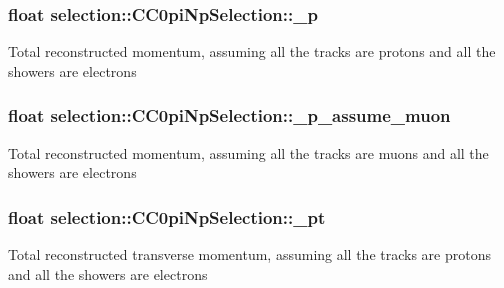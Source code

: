 \subsubsection[{\texorpdfstring{\+\_\+p}{_p}}]{\setlength{\rightskip}{0pt plus 5cm}float selection\+::\+C\+C0pi\+Np\+Selection\+::\+\_\+p\hspace{0.3cm}{\ttfamily [private]}}\hypertarget{classselection_1_1CC0piNpSelection_afae64b232d6b3526032b289c91b092cb}{}\label{classselection_1_1CC0piNpSelection_afae64b232d6b3526032b289c91b092cb}
Total reconstructed momentum, assuming all the tracks are protons and all the showers are electrons 
\subsubsection[{\texorpdfstring{\+\_\+p\+\_\+assume\+\_\+muon}{_p_assume_muon}}]{\setlength{\rightskip}{0pt plus 5cm}float selection\+::\+C\+C0pi\+Np\+Selection\+::\+\_\+p\+\_\+assume\+\_\+muon\hspace{0.3cm}{\ttfamily [private]}}\hypertarget{classselection_1_1CC0piNpSelection_a2e861bf5b394c18e24f58d9fef5c33a5}{}\label{classselection_1_1CC0piNpSelection_a2e861bf5b394c18e24f58d9fef5c33a5}
Total reconstructed momentum, assuming all the tracks are muons and all the showers are electrons 
\subsubsection[{\texorpdfstring{\+\_\+pt}{_pt}}]{\setlength{\rightskip}{0pt plus 5cm}float selection\+::\+C\+C0pi\+Np\+Selection\+::\+\_\+pt\hspace{0.3cm}{\ttfamily [private]}}\hypertarget{classselection_1_1CC0piNpSelection_a98281b58b33ff8c03fa9b00f3f3baa06}{}\label{classselection_1_1CC0piNpSelection_a98281b58b33ff8c03fa9b00f3f3baa06}
Total reconstructed transverse momentum, assuming all the tracks are protons and all the showers are electrons 
